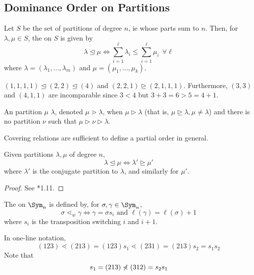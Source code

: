 \documentclass[11pt,leqno,oneside]{amsart}
\numberwithin{thm}{section}
\newcommand{\dominates}{\mathrel{\unrhd}}
\newcommand{\strictlydominates}{\mathrel{\rhd}}
\newcommand{\dominatedby}{\mathrel{\unlhd}}
\newcommand{\covers}{\mathrel{\gtrdot}}
\newcommand{\coveredby}{\mathrel{\lessdot}}
\begin{document}
\subsection{Dominance Order on Partitions}
\begin{defn}
  Let \(S\) be the set of partitions of degree \(n\), ie whose parts
  sum to \(n\). Then, for \(\lambda,\mu \in S\), the  on \(S\) is given by \[
    \lambda \dominatedby \mu \iff \sum_{i=1}^\ell \lambda_i \leq
    \sum_{i=1}^\ell \mu_i \ \ \forall \ell
  \]
  where \(\lambda = (\lambda_1, \ldots, \lambda_m)\) and \(\mu =
  (\mu_1, \ldots, \mu_k)\).
\end{defn}
\begin{example}
  \((1,1,1,1) \dominatedby (2,2) \dominatedby (4)\) and \((2,2,1)
  \dominates (2,1,1,1)\). Furthermore, \((3,3)\) and \((4,1,1)\) are
  incomparable since \(3 < 4\) but \(3+3=6>5=4+1\).
\end{example}
\begin{defn}
  An partition \(\mu\)  \(\lambda\), denoted \(\mu \covers
  \lambda\),  when \(\mu
  \strictlydominates \lambda\) (that is, \(\mu \dominates \lambda, \mu
  \neq \lambda\)) and there is no partition \(\nu\) such that \(\mu
  \strictlydominates \nu \strictlydominates \lambda\).
\end{defn}
\begin{rmk}
  Covering relations are sufficient to define a partial order in
  general. 
\end{rmk}
\begin{prop}
  Given partitions \(\lambda,\mu\) of degree \(n\), \[
    \lambda \dominatedby \mu \iff \lambda' \dominates \mu'
  \]
  where \(\lambda'\) is the conjugate partition to \(\lambda\), and
  similarly for \(\mu'\).
\end{prop}
\begin{proof}
  See \cite{macdonald}*{1.11}.
\end{proof}
\begin{defn}
  The  on \(\Sym_n\) is defined by, for \(\sigma,
  \gamma \in \Sym_n\), \[
    \sigma \coveredby_w \gamma \iff \gamma = \sigma s_i \text{ and
    }\ell(\gamma) = \ell(\sigma)+1
  \]
  where \(s_i\) is the transposition switching \(i\) and \(i+1\).
\end{defn}
\begin{example}
  In one-line notation, \[
    (123) \coveredby (213) = (123)s_1 \coveredby (231) = (213)s_2 = s_1s_2
  \]
  Note that \[
    s_1 = (213) \not\coveredby (312) = s_2s_1
  \]
\end{example}
\end{document}
